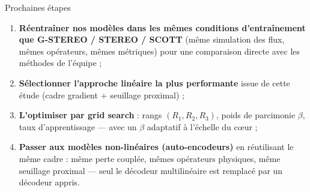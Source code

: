 \documentclass[10pt,aspectratio=169]{beamer}
\begin{document}
\begin{frame}{Prochaines étapes}
\begin{enumerate}
  \item \textbf{Réentraîner nos modèles dans les mêmes conditions
        d'entraînement que G-STEREO / STEREO / SCOTT} (même simulation
        des flux, mêmes opérateurs, mêmes métriques) pour une comparaison
        directe avec les méthodes de l'équipe ;
  \item \textbf{Sélectionner l'approche linéaire la plus performante}
        issue de cette étude (cadre gradient + seuillage proximal) ;
  \item \textbf{L'optimiser par grid search} : rangs $(R_1, R_2, R_3)$,
        poids de parcimonie $\beta$, taux d'apprentissage — avec un
        $\beta$ adaptatif à l'échelle du c\oe ur ;
  \item \textbf{Passer aux modèles non-linéaires (auto-encodeurs)} en
        réutilisant le même cadre : même perte couplée, mêmes opérateurs
        physiques, même seuillage proximal — seul le décodeur
        multilinéaire est remplacé par un décodeur appris.
\end{enumerate}
\end{frame}
\end{document}
